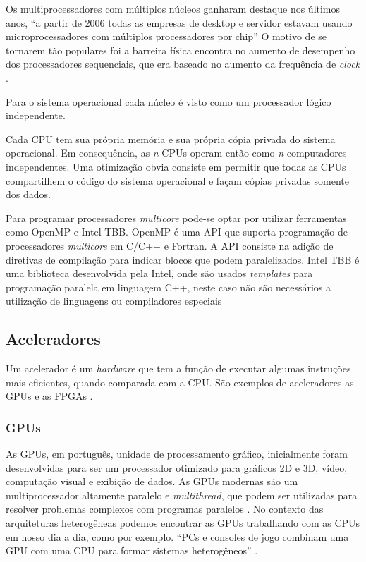 Os multiprocessadores com múltiplos núcleos ganharam destaque nos últimos anos, “a partir de 2006 todas as empresas de desktop e servidor estavam usando microprocessadores com múltiplos processadores por chip” \cite[p.~31]{hennessy2014organizaccao}
O motivo de se tornarem tão populares foi a barreira física encontra no aumento de desempenho dos processadores sequenciais, que era baseado no aumento da frequência de \textit{clock} \cite{hennessy2014organizaccao}.

Para o sistema operacional cada núcleo é visto como um processador lógico independente.

\begin{citacao}
Cada CPU tem sua própria memória e sua própria cópia privada do sistema operacional.
Em consequência, as \emph{n} CPUs operam então como \emph{n} computadores independentes.
Uma otimização obvia consiste em permitir que todas as CPUs compartilhem o código do sistema operacional e façam cópias privadas somente dos dados. \cite[p.~331]{tanenbaum20103a}
\end{citacao}

Para programar processadores \textit{multicore} pode-se optar por utilizar ferramentas como OpenMP e Intel TBB.
OpenMP é uma API que suporta programação de processadores \textit{multicore} em C/C++ e Fortran.
A API consiste na adição de diretivas de compilação para indicar blocos que podem paralelizados.
Intel TBB é uma biblioteca desenvolvida pela Intel, onde são usados \textit{templates} para programação paralela em linguagem C++,
neste caso não são necessários a utilização de linguagens ou compiladores especiais

\subsection{Aceleradores}
Um acelerador é um \textit{hardware} que tem a função de executar algumas instruções mais eficientes,
quando comparada com a CPU. São exemplos de aceleradores as GPUs e as FPGAs \cite{kindratenko2010high}.

\subsubsection{GPUs}
As GPUs, em português, unidade de processamento gráfico, inicialmente foram desenvolvidas para ser um processador otimizado para gráficos 2D e 3D, vídeo,
computação visual e exibição de dados.
As GPUs modernas são um multiprocessador altamente paralelo e \textit{multithread}, que podem ser utilizadas para resolver problemas complexos com programas paralelos \cite{hennessy2014organizaccao}.
No contexto das arquiteturas heterogêneas podemos encontrar as GPUs trabalhando com as CPUs em nosso dia a dia, como por exemplo.
“PCs e consoles de jogo combinam uma GPU com uma CPU para formar sistemas heterogêneos” \cite[p.~A-569]{hennessy2014organizaccao}.

